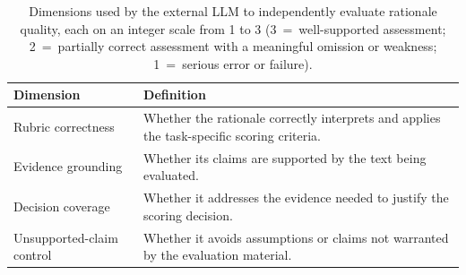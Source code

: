 \begin{table}[t]
\centering
\normalsize
\setlength{\tabcolsep}{6pt}
\begin{tabular}{p{} p{}}
\toprule
Dimension & Definition \\
\midrule
Rubric correctness &
Whether the rationale correctly interprets and applies the task-specific
scoring criteria. \\
\addlinespace
Evidence grounding &
Whether its claims are supported by the text being evaluated. \\
\addlinespace
Decision coverage &
Whether it addresses the evidence needed to justify the scoring decision. \\
\addlinespace
Unsupported-claim control &
Whether it avoids assumptions or claims not warranted by the evaluation
material. \\
\bottomrule
\end{tabular}
\caption{Dimensions used by the external LLM to independently evaluate
rationale quality, each on an integer scale from 1 to 3
(3\ =\ well-supported assessment; 2\ =\ partially correct assessment with
a meaningful omission or weakness; 1\ =\ serious error or failure).}
\label{tab:eval-dimensions}
\end{table}

